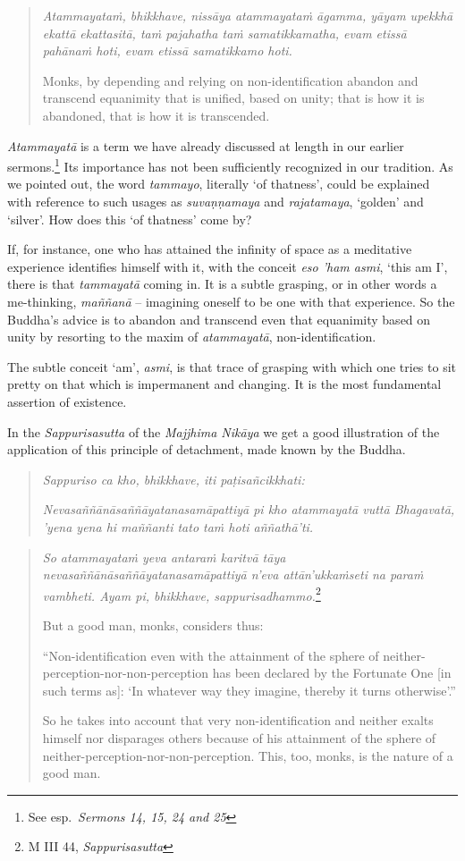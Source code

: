 \begin{quote}
\emph{Atammayataṁ, bhikkhave, nissāya atammayataṁ āgamma, yāyam upekkhā ekattā ekattasitā, taṁ pajahatha taṁ samatikkamatha, evam etissā pahānaṁ hoti, evam etissā samatikkamo hoti.}

Monks, by depending and relying on non-identification abandon and transcend equanimity that is unified, based on unity; that is how it is abandoned, that is how it is transcended.
\end{quote}

\emph{Atammayatā} is a term we have already discussed at length in our earlier sermons.\footnote{See esp.~\emph{Sermons 14, 15, 24 and 25}} Its importance has not been sufficiently recognized in our tradition. As we pointed out, the word \emph{tammayo}, literally `of thatness', could be explained with reference to such usages as \emph{suvaṇṇamaya} and \emph{rajatamaya}, `golden' and `silver'. How does this `of thatness' come by?

If, for instance, one who has attained the infinity of space as a meditative experience identifies himself with it, with the conceit \emph{eso 'ham asmi}, `this am I', there is that \emph{tammayatā} coming in. It is a subtle grasping, or in other words a me-thinking, \emph{maññanā} -- imagining oneself to be one with that experience. So the Buddha's advice is to abandon and transcend even that equanimity based on unity by resorting to the maxim of \emph{atammayatā}, non-identification.

The subtle conceit `am', \emph{asmi}, is that trace of grasping with which one tries to sit pretty on that which is impermanent and changing. It is the most fundamental assertion of existence.

In the \emph{Sappurisasutta} of the \emph{Majjhima Nikāya} we get a good illustration of the application of this principle of detachment, made known by the Buddha.

\begin{quote}
\emph{Sappuriso ca kho, bhikkhave, iti paṭisañcikkhati:}

\emph{Nevasaññānāsaññāyatanasamāpattiyā pi kho atammayatā vuttā Bhagavatā, 'yena yena hi maññanti tato taṁ hoti aññathā'ti.}
\end{quote}

\begin{quote}
\emph{So atammayataṁ yeva antaraṁ karitvā tāya nevasaññānāsaññāyatanasamāpattiyā n'eva attān'ukkaṁseti na paraṁ vambheti. Ayam pi, bhikkhave, sappurisadhammo.}\footnote{M III 44, \emph{Sappurisasutta}}

But a good man, monks, considers thus:

``Non-identification even with the attainment of the sphere of neither-perception-nor-non-perception has been declared by the Fortunate One {[}in such terms as{]}: `In whatever way they imagine, thereby it turns otherwise'.''

So he takes into account that very non-identification and neither exalts himself nor disparages others because of his attainment of the sphere of neither-perception-nor-non-perception. This, too, monks, is the nature of a good man.
\end{quote}

